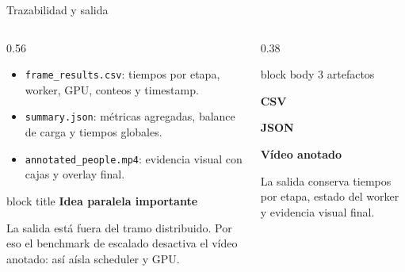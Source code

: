 \documentclass[aspectratio=169,11pt]{beamer}
\newcommand{\callout}[2]{
  \begin{beamercolorbox}[wd=\linewidth,sep=0.6em,rounded=true,shadow=false]{block title}
    {\bfseries #1}\par
    \vspace{0.15em}
    {\footnotesize #2}
  \end{beamercolorbox}
}
\begin{document}
\begin{frame}{Trazabilidad y salida}
  \small
  \begin{columns}[T,totalwidth=\textwidth]
    \begin{column}{0.56\textwidth}
      \begin{itemize}
        \item \texttt{frame\_results.csv}: tiempos por etapa, worker, GPU, conteos y timestamp.
        \item \texttt{summary.json}: métricas agregadas, balance de carga y tiempos globales.
        \item \texttt{annotated\_people.mp4}: evidencia visual con cajas y overlay final.
      \end{itemize}

      \vspace{0.25em}
      \callout{Idea paralela importante}{
        La salida está fuera del tramo distribuido. Por eso el benchmark de escalado desactiva el vídeo anotado: así aísla scheduler y GPU.}
    \end{column}
    \begin{column}{0.38\textwidth}
      \begin{beamercolorbox}[wd=\linewidth,sep=0.8em,rounded=true,shadow=false]{block body}
        {\small\color{GraphGray}3 artefactos}\par
        \vspace{0.15em}
        {\bfseries\fontsize{18}{20}\selectfont CSV}\par
        {\bfseries\fontsize{18}{20}\selectfont JSON}\par
        {\bfseries\fontsize{18}{20}\selectfont Vídeo anotado}\par
        \vspace{0.2em}
        {\footnotesize La salida conserva tiempos por etapa, estado del worker y evidencia visual final.}
      \end{beamercolorbox}
    \end{column}
  \end{columns}
\end{frame}
\end{document}
